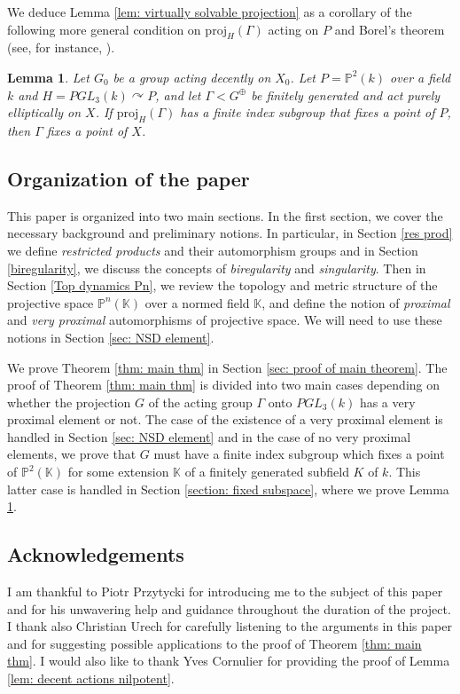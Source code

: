 \documentclass[12pt]{article}
\newtheorem{lem}[thm]{Lemma}
\theoremstyle{definition}
\newcommand{\K}{\mathbb{K}}
\begin{document}
We deduce Lemma \ref{lem: virtually solvable projection} as a corollary of the following more general condition on $\mathrm{proj}_H(\Gamma)$ acting on $P$ and Borel's theorem (see, for instance, \cite[14.65]{KapDrutu}). 

\begin{lem}
    \label{lem: virtually fixed point}
    Let $G_0$ be a group acting decently on $X_0$. Let $P = \mathbb{P}^2(k)$ over a field $k$ and $H = PGL_3(k) \curvearrowright P$, and let $\Gamma < G^{\oplus}$ be finitely generated and act purely elliptically on $X$. If $\mathrm{proj}_H(\Gamma)$ has a finite index subgroup that fixes a point of $P$, then $\Gamma$ fixes a point of $X$.
\end{lem}

\subsection{Organization of the paper}

This paper is organized into two main sections. In the first section, we cover the necessary background and preliminary notions. In particular, in Section \ref{res prod} we define \emph{restricted products} and their automorphism groups and in Section \ref{biregularity}, we discuss the concepts of \emph{biregularity} and \emph{singularity}. Then in Section \ref{Top dynamics Pn}, we review the topology and metric structure of the projective space $\mathbb{P}^n(\K)$ over a normed field $\K$, and define the notion of \emph{proximal} and \emph{very proximal} automorphisms of projective space. We will need to use these notions in Section \ref{sec: NSD element}.  

We prove Theorem \ref{thm: main thm} in Section \ref{sec: proof of main theorem}. The proof of Theorem \ref{thm: main thm} is divided into two main cases depending on whether the projection $G$ of the acting group $\Gamma$ onto $PGL_3 (k)$ has a very proximal element or not. The case of the existence of a very proximal element is handled in Section \ref{sec: NSD element} and in the case of no very proximal elements, we prove that $G$ must have a finite index subgroup which fixes a point of $\mathbb{P}^2(\K)$ for some extension $\K$ of a finitely generated subfield $K$ of $k$. This latter case is handled in Section \ref{section: fixed subspace}, where we prove Lemma \ref{lem: virtually fixed point}. 

\subsection{Acknowledgements} I am thankful to Piotr Przytycki for introducing me to the subject of this paper and for his unwavering help and guidance throughout the duration of the project. I thank also Christian Urech for carefully listening to the arguments in this paper and for suggesting possible applications to the proof of Theorem \ref{thm: main thm}. I would also like to thank Yves Cornulier for providing the proof of Lemma \ref{lem: decent actions nilpotent}.
\end{document}
